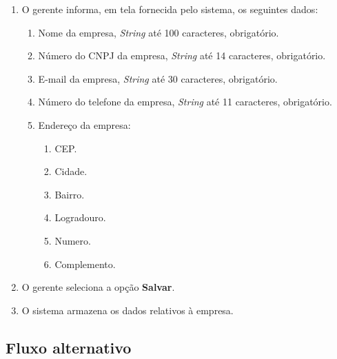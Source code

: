 \begin{enumerate}
	\item O gerente informa, em tela fornecida pelo sistema, os seguintes dados:
	\begin{enumerate}
		\item Nome da empresa, \emph{String} até 100 caracteres, obrigatório.
		\item Número do CNPJ da empresa, \emph{String} até 14 caracteres, obrigatório.
		\item E-mail da empresa, \emph{String} até 30 caracteres, obrigatório.
		\item Número do telefone da empresa, \emph{String} até 11 caracteres, obrigatório.
		\item Endereço da empresa:
		\begin{enumerate}
			\item CEP.
			\item Cidade.
			\item Bairro.
			\item Logradouro.
			\item Numero.
			\item Complemento.
		\end{enumerate}	
	\end{enumerate}
	\item O gerente seleciona a opção \textbf{Salvar}.
	\item O sistema armazena os dados relativos à empresa.
\end{enumerate}

\subsection{Fluxo alternativo}

